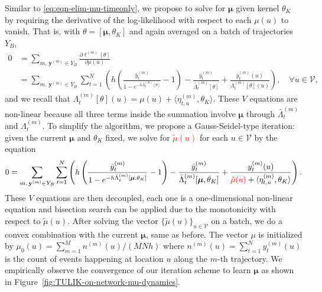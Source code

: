 \documentclass[11pt]{article}
\newcommand{\xc}[1]{\textcolor{orange}{\textsf{XC: #1}}}
\theoremstyle{remark}
\theoremstyle{plain}
\newcommand{\calV}{\mathcal{V}}
\begin{document}
Similar to \eqref{eq:eqn-elim-mu-timeonly}, we propose to solve for $\boldsymbol \mu$ given kernel $\theta_K$ by requiring the derivative of the log-likelihood with respect to each $\mu(u)$ to vanish. That is, with $\theta = [\boldsymbol \mu, \theta_K]$ and again averaged on a batch of trajectories $Y_B$, 
\begin{align*}
0 & = \sum_{m, \, \mathbf{y}^{(m)} \in Y_B} \frac{\partial \ell^{(m)}[ \theta ]}{\partial \mu(u)} \nonumber \\
& =  \sum_{m, \, \mathbf{y}^{(m)} \in Y_B}  
	\sum_{t=1}^N  \left( 
	h \left(  \frac{  \bar y_t^{(m)}   }{ 1- e^{-  h  \bar \Lambda_t^{(m)}[ \theta] }}   -1 \right)
	- \frac{\bar y^{(m)}_t}{ \bar \Lambda^{(m)}_t [ \theta] }
	+ \frac{y^{(m)}_t(u)}{\Lambda^{(m)}_t[ \theta] (u)}
	\right),
\quad \forall u \in \calV,
\end{align*}
and we recall that  $\Lambda_t^{(m)} [\theta] (u) = \mu(u) + \langle \eta^{(m)}_{t, u}, \theta_K \rangle$.
These $V$ equations are non-linear because all three terms inside the summation involve $\boldsymbol \mu$ through
$\bar \Lambda_t^{(m)}$ and $\Lambda_t^{(m)}$. 
To simplify the algorithm, we propose a Gauss-Seidel-type iteration: given the current $\boldsymbol \mu$ and $\theta_K$ fixed, 
we solve for \textcolor{red}{$\tilde \mu(u)$} for each $u \in \calV$ by the equation
\begin{equation}\label{eq:eqn-elim-mu-graph}
0 = \sum_{m, \, \mathbf{y}^{(m)} \in Y_B}  
	\sum_{t=1}^N  \left( 
	h \left(  \frac{  \bar y_t^{(m)}   }{ 1- e^{-  h  \bar \Lambda_t^{(m)}[ \boldsymbol \mu, \theta_K] }}   -1 \right)
	- \frac{\bar y^{(m)}_t}{ \bar \Lambda^{(m)}_t [ \boldsymbol \mu, \theta_K ] }
	+ \frac{y^{(m)}_t(u)}{ \textcolor{red}{\tilde \mu(u)} + \langle \eta^{(m)}_{t, u}, \theta_K \rangle }
	\right).
\end{equation}
These $V$ equations are then decoupled, each one is a one-dimensional non-linear equation and bisection search can be applied due to the monotonicity with respect to $\tilde \mu(u)$. 
After solving the vector $\{\tilde \mu (u) \}_{u \in \calV}$ on a batch, we do a convex combination with the current $\boldsymbol \mu$, same as before. 
The vector $\mu$ is initialized by
$\mu_0(u) = \sum_{m=1}^M n^{(m)}(u)/(MNh)$ where $n^{(m)}(u) = \sum_{t=1}^N y^{(m)}_t(u)$ is the count of events happening at location $u$ along the $m$-th trajectory.
We empirically observe the convergence of our iteration scheme to learn $\boldsymbol \mu$ as shown in Figure~\ref{fig:TULIK-on-network-mu-dynamics}.%
\end{document}
